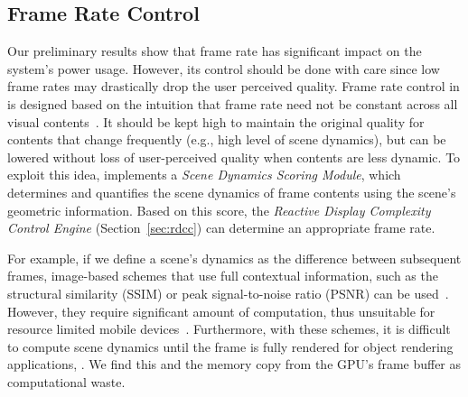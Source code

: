 \subsection{Frame Rate Control}

Our preliminary results show that frame rate has significant impact on the 
system's power usage. However, its control should be done with care since 
low frame rates may drastically drop the user perceived quality.
%
%
Frame rate control in {\myit} is designed based on the intuition that frame rate 
need not be constant across all visual contents~\cite{Lim18Adaptive}.
%
It should be kept high to maintain the original quality for contents that change
frequently (e.g., high level of scene dynamics), but can be lowered without loss
of user-perceived quality when contents are less dynamic.
%
To exploit this idea, {\myit} implements a {\it Scene Dynamics Scoring Module},
which determines and quantifies the scene dynamics of frame contents using the 
scene's geometric information.
%
Based on this score, the {\it Reactive Display Complexity Control Engine} 
(Section~\ref{sec:rdcc}) can determine an appropriate frame rate.

For example, if we define a scene's dynamics as the difference 
between subsequent frames, image-based schemes that use 
full contextual information, such as the structural similarity (SSIM) or peak signal-to-noise ratio (PSNR) can be used~\cite{ssim,psnr}.
%
However, they require significant amount of computation,
thus unsuitable for resource limited mobile devices~\cite{ssim,Hwang:2017:RPO}.
%
%
%
%
Furthermore, with these schemes, it is difficult to compute scene dynamics until the frame is fully rendered for object rendering applications, .
We find this and the memory copy from the GPU's frame buffer as computational waste.

